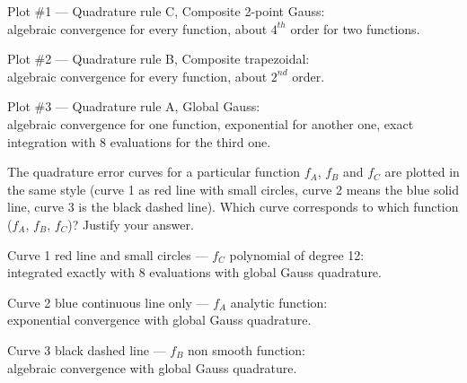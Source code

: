 \begin{problem}
\begin{subproblem}[3]
\begin{solution}
Plot \#1 --- Quadrature rule C, Composite 2-point Gauss:\\
algebraic convergence for every function, about $4^{th}$ order for two functions.

Plot \#2 --- Quadrature rule B, Composite trapezoidal:\\ algebraic convergence for every function, about $2^{nd}$ order.

Plot \#3 --- Quadrature rule A, Global Gauss:\\ algebraic convergence for one function, exponential for another one, exact integration with 8 evaluations for the third one.
\end{solution}
\end{subproblem}


\begin{subproblem}[3] \label{prb:QuadraturePlots_2}
The quadrature error curves for a particular function $f_A$, $f_B$ and $f_C$ are plotted in the same style (curve 1 as red line with small circles, curve 2 means the blue solid line, curve 3 is the black dashed line).
Which curve corresponds to which function ($f_A$, $f_B$, $f_C$)?
Justify your answer.

\begin{solution}
Curve 1 red line and small circles --- $f_C$ polynomial of degree 12:\\
integrated exactly with 8 evaluations with global Gauss quadrature.

Curve 2 blue continuous line only --- $f_A$ analytic function:\\
exponential convergence with global Gauss quadrature.

Curve 3 black dashed line --- $f_B$ non smooth function:\\
algebraic convergence with global Gauss quadrature.
\end{solution}
\end{subproblem}
\end{problem}
